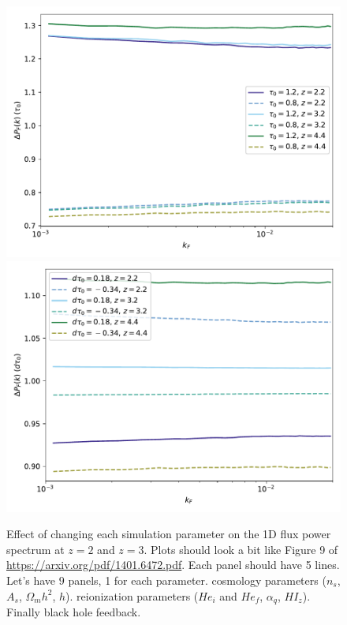 \documentclass[a4paper,11pt]{article}
\begin{document}
\begin{figure}
    \centering
	\includegraphics[width=0.48\columnwidth]{figures/single_param_tau0.pdf}
    \includegraphics[width=0.48\columnwidth]{figures/single_param_dtau0.pdf}

    \caption{Effect of changing each simulation parameter on the 1D flux power spectrum at $z=2$ and $z=3$. Plots should look a bit like Figure 9 of \url{https://arxiv.org/pdf/1401.6472.pdf}. Each panel should have 5 lines. Let's have $9$ panels, 1 for each parameter. cosmology parameters ($n_s$, $A_s$, $\Omega_m h^2$, $h$). reionization parameters ($He_i$ and $He_f$, $\alpha_q$, $HI_z$). Finally black hole feedback. }
    \label{fig:tau0fluxpower}
\end{figure}
\end{document}
